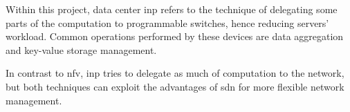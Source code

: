 Within this project, data center \gls{inp} refers to the technique of delegating some parts of the computation to programmable switches, hence reducing servers' workload.
Common operations performed by these devices are data aggregation and key-value storage management.


In contrast to \gls{nfv}, \gls{inp} tries to delegate as much of computation to the network, but both techniques can exploit the advantages of \gls{sdn} for more flexible network management.